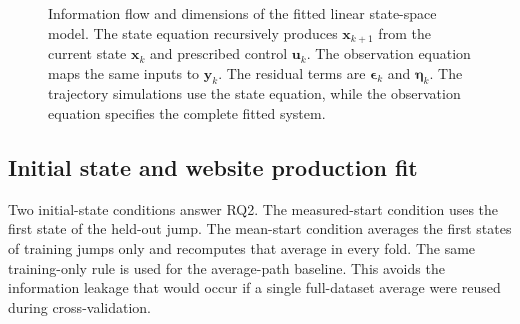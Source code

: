 \documentclass[11pt,twoside,a4paper]{article}
\begin{document}
\begin{figure}[htb]
{%
  }
  \caption{Information flow and dimensions of the fitted linear state-space model. The state equation recursively produces $\mathbf{x}_{k+1}$ from the current state $\mathbf{x}_k$ and prescribed control $\mathbf{u}_k$. The observation equation maps the same inputs to $\mathbf{y}_k$. The residual terms are $\boldsymbol{\epsilon}_k$ and $\boldsymbol{\eta}_k$. The trajectory simulations use the state equation, while the observation equation specifies the complete fitted system.}
  \label{fig:matrices}
\end{figure}

\subsection{Initial state and website production fit}

Two initial-state conditions answer RQ2. The measured-start condition uses the first state of the held-out jump. The mean-start condition averages the first states of training jumps only and recomputes that average in every fold. The same training-only rule is used for the average-path baseline. This avoids the information leakage that would occur if a single full-dataset average were reused during cross-validation.
\end{document}
